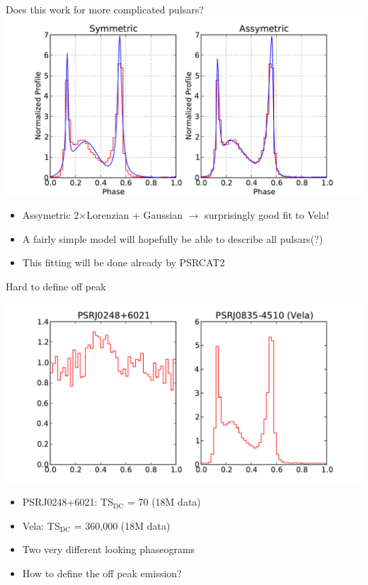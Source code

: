 \documentclass[12pt]{beamer}
\begin{document}
\begin{frame}{Does this work for more complicated pulsars?}
    \includegraphics[width=.85\textwidth]{plots/vela.pdf}
  \begin{itemize}
    \item Assymetric 2$\times$Lorenzian + Gaussian $\rightarrow$ surprisingly good fit
      to Vela!
    \item A fairly simple model will hopefully be able to describe all pulsars(?)
    \item This fitting will be done already by PSRCAT2
  \end{itemize}
\end{frame}


\begin{frame}{Hard to define off peak}

  \includegraphics[width=.85\textwidth]{plots/compare_faint_bright.pdf}

  \begin{itemize}
    \item PSRJ0248+6021: TS$_\text{DC}$ = 70 (18M data)
    \item Vela: TS$_\text{DC}$ = 360,000 (18M data) 
    \item Two very different looking phaseograms
    \item How to define the off peak emission?
  \end{itemize}
\end{frame}
\end{document}
